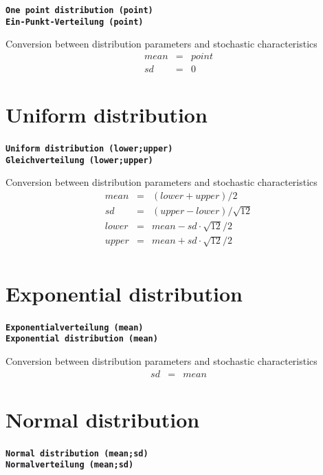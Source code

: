 \documentclass{svmono}
\def\cm#1{\textbf{\texttt{#1}}}
\begin{document}
\cm{One point distribution (point)}~\\
\cm{Ein-Punkt-Verteilung (point)}

Conversion between distribution parameters and stochastic characteristics
\begin{eqnarray*}
mean&=&point\\
sd&=&0
\end{eqnarray*}





\section*{Uniform distribution}

\cm{Uniform distribution (lower;upper)}~\\
\cm{Gleichverteilung (lower;upper)}

Conversion between distribution parameters and stochastic characteristics
\begin{eqnarray*}
mean&=&(lower+upper)/2\\
sd&=&(upper-lower)/\sqrt{12}\\
lower&=&mean-sd\cdot\sqrt{12}/2\\
upper&=&mean+sd\cdot\sqrt{12}/2\\
\end{eqnarray*}





\section*{Exponential distribution}
\cm{Exponentialverteilung (mean)}~\\
\cm{Exponential distribution (mean)}

Conversion between distribution parameters and stochastic characteristics
\begin{eqnarray*}
sd&=&mean
\end{eqnarray*}





\section*{Normal distribution}
\cm{Normal distribution (mean;sd)}~\\
\cm{Normalverteilung (mean;sd)}
\end{document}
